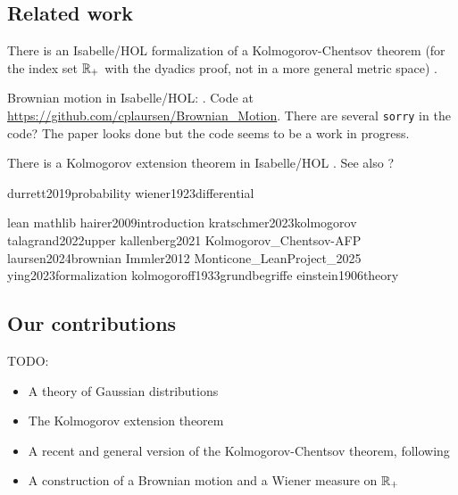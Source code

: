 \documentclass[lean]{DraftAFM}
\begin{document}
\subsection{Related work}

There is an Isabelle/HOL formalization of a Kolmogorov-Chentsov theorem (for the index set $\mathbb{R}_+$ with the dyadics proof, not in a more general metric space) \cite{Kolmogorov_Chentsov-AFP}.

Brownian motion in Isabelle/HOL: \cite{laursen2024brownian}.
Code at \href{https://github.com/cplaursen/Brownian_Motion}{https://github.com/cplaursen/Brownian\_Motion}. There are several \lstinline|sorry| in the code? The paper looks done but the code seems to be a work in progress.

There is a Kolmogorov extension theorem in Isabelle/HOL \cite{Immler2012}. See also \cite{holzl2017markov} ?




durrett2019probability
wiener1923differential



lean
mathlib
hairer2009introduction
kratschmer2023kolmogorov
talagrand2022upper
kallenberg2021
Kolmogorov_Chentsov-AFP
laursen2024brownian
Immler2012
Monticone_LeanProject_2025
ying2023formalization
kolmogoroff1933grundbegriffe
einstein1906theory


\subsection{Our contributions}

TODO:
\begin{itemize}
  \item A theory of Gaussian distributions
  \item The Kolmogorov extension theorem
  \item A recent and general version of the Kolmogorov-Chentsov theorem, following \cite{kratschmer2023kolmogorov}
  \item A construction of a Brownian motion and a Wiener measure on $\mathbb{R}_+$
\end{itemize}
\end{document}
